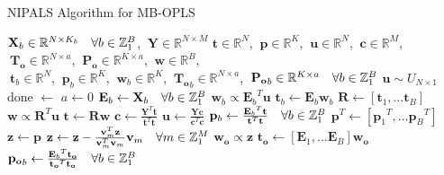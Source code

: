 \begin{algorithm}[H]
\caption{NIPALS Algorithm for MB-OPLS}
\label{algorithm.3.6}
\begin{algorithmic}[1]
\REQUIRE $\mathbf{X}_b \in \mathbb{R}^{N \times K_b}
          \quad \forall b \in \mathbb{Z}_{1}^{B}$,%
       $\:\mathbf{Y} \in \mathbb{R}^{N \times M}$
\ENSURE $\mathbf{t} \in \mathbb{R}^N$,%
      $\:\mathbf{p} \in \mathbb{R}^K$,%
      $\:\mathbf{u} \in \mathbb{R}^N$,%
      $\:\mathbf{c} \in \mathbb{R}^M$,%
      $\:\mathbf{T_o} \in \mathbb{R}^{N \times a}$,%
      $\:\mathbf{P_o} \in \mathbb{R}^{K \times a}$,%
      $\:\mathbf{w} \in \mathbb{R}^B$, \\
      $\:\mathbf{t}_b \in \mathbb{R}^N$,%
      $\:\mathbf{p}_b \in \mathbb{R}^K$,%
      $\:\mathbf{w}_b \in \mathbb{R}^K$,%
      $\:\mathbf{T_o}_b \in \mathbb{R}^{N \times a}$,%
      $\:\mathbf{P_o}_b \in \mathbb{R}^{K \times a}
       \quad \forall b \in \mathbb{Z}_{1}^{B}$
\STATE $\mathbf{u} \sim U_{N \times 1}$ 
\STATE done $\gets$ \FALSE
\STATE $a \gets 0$
\STATE $\mathbf{E}_b \gets \mathbf{X}_b
        \quad \forall b \in \mathbb{Z}_{1}^{B}$
  \REPEAT
      \STATE $\mathbf{w}_b \propto {\mathbf{E}_b}^T \mathbf{u}$
      \STATE $\mathbf{t}_b \gets \mathbf{E}_b \mathbf{w}_b$
    \ENDFOR
    \STATE $\mathbf{R} \gets [\mathbf{t}_1, \dots \mathbf{t}_B]$
    \STATE $\mathbf{w} \propto \mathbf{R}^T \mathbf{u}$
    \STATE $\mathbf{t} \gets \mathbf{R} \mathbf{w}$
    \STATE $\mathbf{c} \gets \tfrac{\mathbf{Y}^T \mathbf{t}}
                                   {\mathbf{t}^T \mathbf{t}}$
    \STATE $\mathbf{u} \gets \tfrac{\mathbf{Y} \mathbf{c}}
                                   {\mathbf{c}^T \mathbf{c}}$
  \UNTIL{$\tau < \varepsilon$}
  \STATE $\mathbf{p}_b \gets \tfrac{{\mathbf{E}_b}^T \mathbf{t}}
                                   {\mathbf{t}^T \mathbf{t}}
          \quad \forall b \in \mathbb{Z}_{1}^{B}$
  \STATE $\mathbf{p}^T \gets [{\mathbf{p}_1}^T, \dots {\mathbf{p}_B}^T]$
  \STATE $\mathbf{z} \gets \mathbf{p}$
  \STATE $\mathbf{z} \gets \mathbf{z} -
          \tfrac{\mathbf{v}_m^T \mathbf{z}}
                {\mathbf{v}_m^T \mathbf{v}_m} \mathbf{v}_m
          \quad \forall m \in \mathbb{Z}_{1}^{M}$
  \STATE $\mathbf{w_o} \propto \mathbf{z}$
  \STATE $\mathbf{t_o} \gets [\mathbf{E}_1, \dots \mathbf{E}_B] \mathbf{w_o}$
  \STATE $\mathbf{p_o}_b \gets
          \tfrac{{\mathbf{E}_b}^T \mathbf{t_o}}
                {\mathbf{t_o}^T \mathbf{t_o}}
          \quad \forall b \in \mathbb{Z}_{1}^{B}$

\end{algorithmic}
\end{algorithm}
